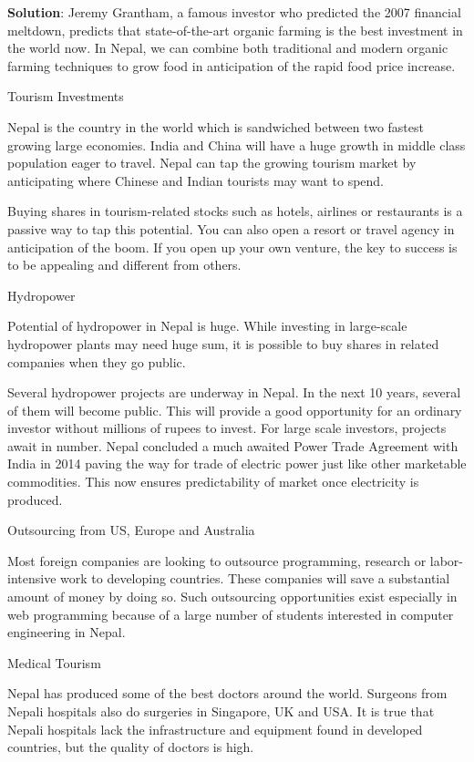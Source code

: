 \documentclass[
  openany]{book}
\newenvironment{solution}{ {\bfseries Solution}:}{}
\begin{document}
\begin{questions}
\begin{solution}
Jeremy Grantham, a famous investor who predicted the 2007 financial meltdown, predicts that state-of-the-art organic farming is the best investment in the world now. In Nepal, we can combine both traditional and modern organic farming techniques to grow food in anticipation of the rapid food price increase.

Tourism Investments

Nepal is the country in the world which is sandwiched between two fastest growing large economies. India and China will have a huge growth in middle class population eager to travel. Nepal can tap the growing tourism market by anticipating where Chinese and Indian tourists may want to spend.

Buying shares in tourism-related stocks such as hotels, airlines or restaurants is a passive way to tap this potential. You can also open a resort or travel agency in anticipation of the boom. If you open up your own venture, the key to success is to be appealing and different from others.

Hydropower

Potential of hydropower in Nepal is huge. While investing in large-scale hydropower plants may need huge sum, it is possible to buy shares in related companies when they go public.

Several hydropower projects are underway in Nepal. In the next 10 years, several of them will become public. This will provide a good opportunity for an ordinary investor without millions of rupees to invest. For large scale investors, projects await in number. Nepal concluded a much awaited Power Trade Agreement with India in 2014 paving the way for trade of electric power just like other marketable commodities. This now ensures predictability of market once electricity is produced.

Outsourcing from US, Europe and Australia

Most foreign companies are looking to outsource programming, research or labor-intensive work to developing countries. These companies will save a substantial amount of money by doing so. Such outsourcing opportunities exist especially in web programming because of a large number of students interested in computer engineering in Nepal.

Medical Tourism

Nepal has produced some of the best doctors around the world. Surgeons from Nepali hospitals also do surgeries in Singapore, UK and USA. It is true that Nepali hospitals lack the infrastructure and equipment found in developed countries, but the quality of doctors is high.


\end{solution}
\end{questions}
\end{document}

